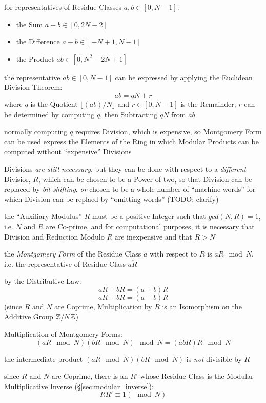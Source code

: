 for representatives of Residue Classes $a, b \in [0, N - 1]$:
\begin{itemize}
  \item the Sum $a + b \in [0, 2N -2]$
  \item the Difference $a - b \in [-N + 1, N - 1]$
  \item the Product $ab \in [0, N^2 - 2N + 1]$
\end{itemize}

the representative $ab \in [0, N-1]$ can be expressed by applying the Euclidean
Division Theorem:
\[
  ab = qN + r
\]
where $q$ is the Quotient $\lfloor{(ab) / N}\rfloor$ and $r \in [0, N-1]$ is the
Remainder; $r$ can be determined by computing $q$, then Subtracting $qN$ from
$ab$

normally computing $q$ requires Division, which is expensive, so Montgomery
Form can be used express the Elements of the Ring in which Modular Products can
be computed without ``expensive'' Divisions

Divisions \emph{are still necessary}, but they can be done with respect to a
\emph{different} Divisior, $R$, which can be chosen to be a Power-of-two, so
that Division can be replaced by \emph{bit-shifting}, \emph{or} chosen to be a
whole number of ``machine words'' for which Division can be replaed by
``omitting words'' (TODO: clarify)

the ``Auxiliary Modulus'' $R$ must be a positive Integer such that
$gcd(N, R) = 1$, i.e. $N$ and $R$ are Co-prime, and for computational purposes,
it is necessary that Division and Reduction Modulo $R$ are inexpensive and that
$R > N$

the \emph{Montgomery Form} of the Residue Class $\overline{a}$ with respect to
$R$ is $aR \mod N$, i.e. the representative of Residue Class $\overline{aR}$

by the Distributive Law:
\[
  aR + bR = (a + b) R
\] \[
  aR - bR = (a - b) R
\]
(since $R$ and $N$ are Coprime, Multiplication by $R$ is an Isomorphism on the
Additive Group $\mathbb{Z} / N \mathbb{Z}$)

Multiplication of Montgomery Forms:
\[
  (aR \mod N) (bR \mod N) \mod N = (abR)R \mod N
\]

the intermediate product $(aR \mod N) (bR \mod N)$ is \emph{not} divisible by
$R$

since $R$ and $N$ are Coprime, there is an $R'$ whose Residue Class is the
Modular Multiplicative Inverse (\S\ref{sec:modular_inverse}):
\[
  R R' \equiv 1 (\mod N)
\]



